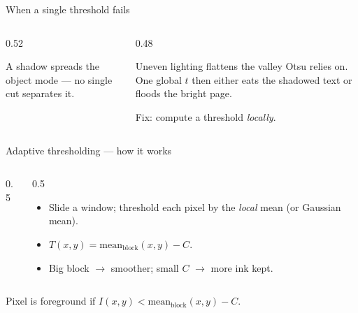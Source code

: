 \documentclass[10pt,aspectratio=169]{beamer}
\begin{document}
\begin{frame}{When a single threshold fails}
  \begin{columns}[T]
    \begin{column}{0.52\textwidth}
      {\scriptsize A shadow spreads the object mode --- no single cut separates it.}
    \end{column}
    \begin{column}{0.48\textwidth}
      \begin{badbox}
        Uneven lighting flattens the valley Otsu relies on. One global $t$ then either
        eats the shadowed text or floods the bright page.
      \end{badbox}
      Fix: compute a threshold \emph{locally}.
    \end{column}
  \end{columns}
\end{frame}

\begin{frame}{Adaptive thresholding --- how it works}
  \begin{columns}[T]
    \begin{column}{0.5\textwidth}
    \end{column}
    \begin{column}{0.5\textwidth}
      \begin{itemize}
        \item Slide a window; threshold each pixel by the \emph{local} mean (or Gaussian mean).
        \item $T(x,y)=\mathrm{mean}_{\text{block}}(x,y)-C$.
        \item Big block $\to$ smoother; small $C$ $\to$ more ink kept.
      \end{itemize}
    \end{column}
  \end{columns}
  \begin{mathbox}
    Pixel is foreground if $I(x,y) < \mathrm{mean}_{\text{block}}(x,y) - C$.
  \end{mathbox}
\end{frame}
\end{document}
